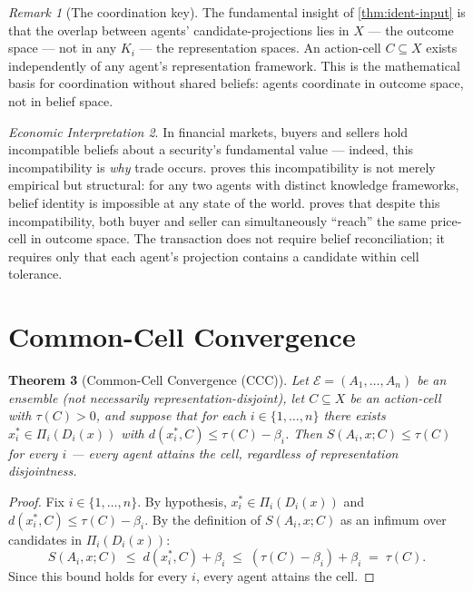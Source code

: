 \documentclass[twocolumn,11pt,a4paper]{article}
\newtheorem{theorem}{Theorem}[section]
\theoremstyle{remark}
\newtheorem{remark}[theorem]{Remark}
\newtheorem{econinterp}[theorem]{Economic Interpretation}
\newcommand{\tol}{\tau}
\newcommand{\Ens}{\mathcal{E}}            %
\begin{document}
\begin{remark}[The coordination key]
\label{rem:coord-key}
The fundamental insight of \cref{thm:ident-input} is that the overlap
between agents' candidate-projections lies in $X$ — the outcome space —
not in any $K_i$ — the representation spaces.  An action-cell $C \subseteq
X$ exists independently of any agent's representation framework.  This is
the mathematical basis for coordination without shared beliefs: agents
coordinate in outcome space, not in belief space.
\end{remark}

\begin{econinterp}
\label{ei:belief-incompatibility}
In financial markets, buyers and sellers hold incompatible beliefs about a
security's fundamental value — indeed, this incompatibility is \emph{why}
trade occurs.   proves this incompatibility
is not merely empirical but structural: for any two agents with distinct
knowledge frameworks, belief identity is impossible at any state of the
world.   proves that despite this incompatibility,
both buyer and seller can simultaneously ``reach'' the same price-cell in
outcome space.  The transaction does not require belief reconciliation; it
requires only that each agent's projection contains a candidate within
cell tolerance.
\end{econinterp}

\section{Common-Cell Convergence}
\label{sec:ccc}

\begin{theorem}[Common-Cell Convergence (CCC)]
\label{thm:ccc}
Let $\Ens = (A_1, \ldots, A_n)$ be an ensemble (not necessarily
representation-disjoint), let $C \subseteq X$ be an action-cell with
$\tol(C) > 0$, and suppose that for each $i \in \{1,\ldots,n\}$ there
exists $x_i^* \in \Pi_i(D_i(x))$ with $d(x_i^*, C) \le \tol(C) - \beta_i$.
Then $S(A_i, x; C) \le \tol(C)$ for every $i$ — every agent attains the
cell, regardless of representation disjointness.
\end{theorem}
\begin{proof}
Fix $i \in \{1,\ldots,n\}$.  By hypothesis, $x_i^* \in \Pi_i(D_i(x))$
and $d(x_i^*, C) \le \tol(C) - \beta_i$.  By the definition of
$S(A_i, x; C)$ as an infimum over candidates in $\Pi_i(D_i(x))$:
\[
  S(A_i, x; C) \;\le\; d(x_i^*, C) + \beta_i
  \;\le\; (\tol(C) - \beta_i) + \beta_i \;=\; \tol(C).
\]
Since this bound holds for every $i$, every agent attains the cell.
\end{proof}
\end{document}
